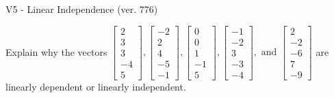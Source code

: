 \begin{exercise}
  \begin{exerciseTitle}V5 - Linear Independence (ver. 776)\end{exerciseTitle}
  \begin{exerciseStatement}
    Explain why the vectors \(\left[\begin{array}{r}
2 \\
3 \\
3 \\
-4 \\
5
\end{array}\right] , \left[\begin{array}{r}
-2 \\
2 \\
4 \\
-5 \\
-1
\end{array}\right] , \left[\begin{array}{r}
0 \\
0 \\
1 \\
-1 \\
5
\end{array}\right] , \left[\begin{array}{r}
-1 \\
-2 \\
3 \\
-3 \\
-4
\end{array}\right] , \text{ and } \left[\begin{array}{r}
2 \\
-2 \\
-6 \\
7 \\
-9
\end{array}\right]\) are linearly dependent or linearly independent.	



\end{exerciseStatement}
\end{exercise}
